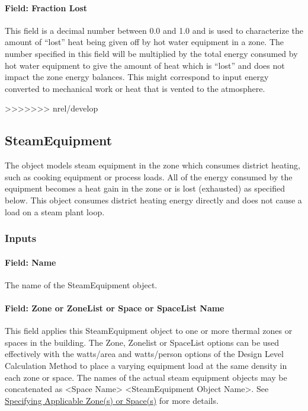 \paragraph{Field: Fraction Lost}\label{field-fraction-lost-2-hw-definition}

This field is a decimal number between 0.0 and 1.0 and is used to characterize the amount of ``lost'' heat being given off by hot water equipment in a zone. The number specified in this field will be multiplied by the total energy consumed by hot water equipment to give the amount of heat which is ``lost'' and does not impact the zone energy balances. This might correspond to input energy converted to mechanical work or heat that is vented to the atmosphere.

>>>>>>> nrel/develop
\subsection{SteamEquipment}\label{steamequipment}

The object models steam equipment in the zone which consumes district heating, such as cooking equipment or process loads. All of the energy consumed by the equipment becomes a heat gain in the zone or is lost (exhausted) as specified below. This object consumes district heating energy directly and does not cause a load on a steam plant loop.

\subsubsection{Inputs}\label{inputs-6-012}

\paragraph{Field: Name}\label{field-name-6-009}

The name of the SteamEquipment object.

\paragraph{Field: Zone or ZoneList or Space or SpaceList Name}\label{steameq-field-zone-or-zonelist-name-000}

This field applies this SteamEquipment object to one or more thermal zones or spaces in the building. The Zone, Zonelist or SpaceList options can be used effectively with the watts/area and watts/person options of the Design Level Calculation Method to place a varying equipment load at the same density in each zone or space. The names of the actual steam equipment objects may be concatenated as \textless{}Space Name\textgreater{} \textless{}SteamEquipment Object Name\textgreater{}. See \hyperref[specifying-applicable-zones-or-spaces]{Specifying Applicable Zone(s) or Space(s)} for more details.

